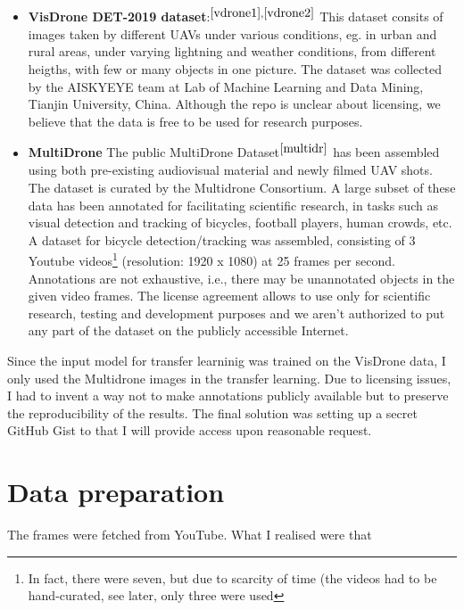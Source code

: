 \documentclass{article}
\begin{document}
\begin{itemize}
    \item \textbf{VisDrone DET-2019 dataset}:$^{\cite{vdrone1},\cite{vdrone2}}$ This dataset consits of images taken by different UAVs under various conditions, eg. in urban and rural areas, under varying lightning and weather conditions, from different heigths, with few or many objects in one picture. The dataset was collected by the AISKYEYE team at Lab of Machine Learning and Data Mining, Tianjin University, China. Although the repo is unclear about licensing, we believe that the data is free to be used for research purposes.
    
    \item \textbf{MultiDrone} The public MultiDrone Dataset$^{\cite{multidr}}$ has been assembled using both pre-existing audiovisual material and newly filmed UAV shots. The dataset is curated by the Multidrone Consortium. A large subset of these data has been annotated for facilitating scientific research, in tasks such as visual detection and tracking of bicycles, football players, human crowds, etc. A dataset for bicycle detection/tracking was assembled, consisting of 3 Youtube videos\footnote{In fact, there were seven, but due to scarcity of time (the videos had to be hand-curated, see later, only three were used} (resolution: 1920 x 1080) at 25 frames per second. Annotations are not exhaustive, i.e., there may be unannotated objects in the given video frames. The license agreement allows to use only for scientific research, testing and development purposes and we aren’t authorized to put any part of the dataset on the publicly accessible Internet.

\end{itemize}

Since the input model for transfer learninig was trained on the VisDrone data, I only used the Multidrone images in the transfer learning. Due to licensing issues, I had to invent a way not to make annotations publicly available but to preserve the reproducibility of the results. The final solution was setting up a secret GitHub Gist to that I will provide access upon reasonable request.

\section{Data preparation}

The frames were fetched from YouTube. What I realised were that 
\end{document}
